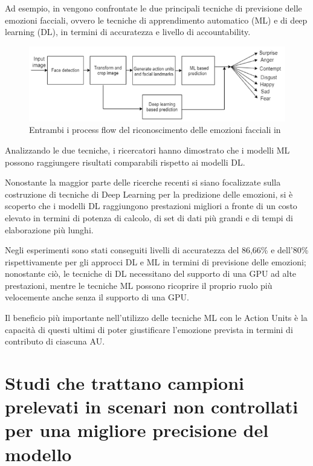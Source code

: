 Ad esempio, in \cite{FaceEmoPredAUsDeepLearn} vengono confrontate le due principali tecniche di previsione delle emozioni facciali, ovvero le tecniche di apprendimento automatico (ML) e di deep learning (DL), in termini di accuratezza e livello di accountability. 
\begin{figure}
    \begin{center}    
        \includegraphics[width=1\linewidth]{images/23.png}
        \caption{Entrambi i process flow del riconoscimento delle emozioni facciali in \cite{FaceEmoPredAUsDeepLearn}}
    \end{center}
\end{figure}

Analizzando le due tecniche, i ricercatori hanno dimostrato che i modelli ML possono raggiungere risultati comparabili rispetto ai modelli DL. 

Nonostante la maggior parte delle ricerche recenti si siano focalizzate sulla costruzione di tecniche di Deep Learning per la predizione delle emozioni, si è scoperto che i modelli DL raggiungono prestazioni migliori a fronte di un costo elevato in termini di potenza di calcolo, di set di dati più grandi e di tempi di elaborazione più lunghi. 

Negli esperimenti sono stati conseguiti livelli di accuratezza del 86,66\% e dell'80\% rispettivamente per gli approcci DL e ML in termini di previsione delle emozioni; nonostante ciò, le tecniche di DL necessitano del supporto di una GPU ad alte prestazioni, mentre le tecniche ML possono ricoprire il proprio ruolo più velocemente anche senza il supporto di una GPU. 

Il beneficio più importante nell'utilizzo delle tecniche ML con le Action Units è la capacità di questi ultimi di poter giustificare l'emozione prevista in termini di contributo di ciascuna AU. 


\section{Studi che trattano campioni prelevati in scenari non controllati per una migliore precisione del modello}

